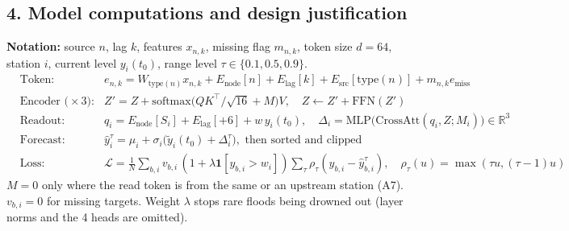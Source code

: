 \documentclass[10pt,a4paper]{article}
\begin{document}
\subsection{4. Model computations and design justification}
\textbf{Notation:} source $n$, lag $k$, features $x_{n,k}$, missing flag $m_{n,k}$, token size $d=64$, station $i$, current level $y_i(t_0)$, range level $\tau\in\{0.1,0.5,0.9\}$.
{\small\begin{align*}
&\text{Token:} && e_{n,k} = W_{\text{type}(n)}x_{n,k} + E_{\text{node}}[n] + E_{\text{lag}}[k] + E_{\text{src}}[\text{type}(n)] + m_{n,k}e_{\text{miss}}\\
&\text{Encoder (}\times 3\text{):} && Z' = Z + \text{softmax}\big(QK^\top/\sqrt{16} + M\big)V,\quad Z \leftarrow Z' + \text{FFN}(Z')\\
&\text{Readout:} && q_i = E_{\text{node}}[S_i] + E_{\text{lag}}[+6] + w\,y_i(t_0),\quad \Delta_i = \text{MLP}\big(\text{CrossAtt}(q_i, Z; M_i)\big)\in\mathbb{R}^3\\
&\text{Forecast:} && \hat y_i^{\tau} = \mu_i + \sigma_i\big(\tilde y_i(t_0) + \Delta_i^{\tau}\big), \text{ then sorted and clipped}\\
&\text{Loss:} && \mathcal{L} = \tfrac{1}{N}\textstyle\sum_{b,i} v_{b,i}\,(1+\lambda\mathbf{1}[y_{b,i}>w_i])\sum_\tau \rho_\tau(y_{b,i}-\hat y^{\tau}_{b,i}),\quad \rho_\tau(u)=\max(\tau u,(\tau-1)u)
\end{align*}}
$M=0$ only where the read token is from the same or an upstream station (A7). $v_{b,i}=0$ for missing targets. Weight $\lambda$ stops rare floods being drowned out (layer norms and the 4 heads are omitted).
\end{document}
